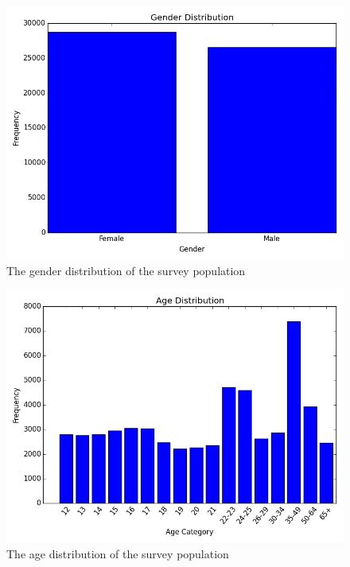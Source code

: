 \documentclass[a4 paper]{article}
\begin{document}
\begin{figure}[H]
	\centering
	\includegraphics[width=5in]{images/genderDist}
	\caption{The gender distribution of the survey population}
\end{figure}

\begin{figure}[H]
	\centering
	\includegraphics[width=5in]{images/ageDist}
	\caption{The age distribution of the survey population}
\end{figure}
\end{document}
